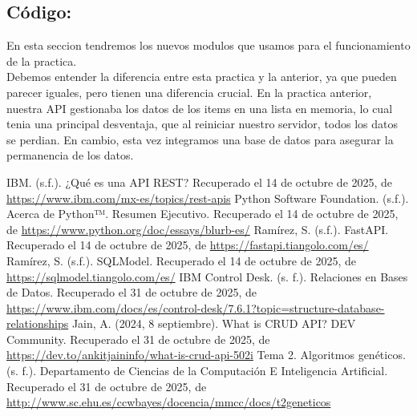 \documentclass[12pt]{article}
\begin{document}
\subsection*{Código:}
En esta seccion tendremos los nuevos modulos que usamos para el funcionamiento de la practica.\\

Debemos entender la diferencia entre esta practica y la anterior, ya que pueden parecer iguales, pero tienen una diferencia crucial. 
En la practica anterior, nuestra API gestionaba los datos de los items en una lista en memoria, lo cual tenia una principal desventaja,
que al reiniciar nuestro servidor, todos los datos se perdian. 
En cambio, esta vez integramos una base de datos para asegurar la permanencia de los datos.



\newpage %

\begin{thebibliography}{99}

     IBM. (s.f.). ¿Qué es una API REST? Recuperado el 14 de octubre de 2025, de \url{https://www.ibm.com/mx-es/topics/rest-apis}
     Python Software Foundation. (s.f.). Acerca de Python™. Resumen Ejecutivo. Recuperado el 14 de octubre de 2025, de \url{https://www.python.org/doc/essays/blurb-es/}
     Ramírez, S. (s.f.). FastAPI. Recuperado el 14 de octubre de 2025, de \url{https://fastapi.tiangolo.com/es/}
     Ramírez, S. (s.f.). SQLModel. Recuperado el 14 de octubre de 2025, de \url{https://sqlmodel.tiangolo.com/es/}
     IBM Control Desk. (s. f.). Relaciones en Bases de Datos. Recuperado el 31 de octubre de 2025, de \url{ https://www.ibm.com/docs/es/control-desk/7.6.1?topic=structure-database-relationships}
     Jain, A. (2024, 8 septiembre). What is CRUD API? DEV Community. Recuperado el 31 de octubre de 2025, de \url{https://dev.to/ankitjaininfo/what-is-crud-api-502i}
     Tema 2. Algoritmos genéticos. (s. f.). Departamento de Ciencias de la Computación E Inteligencia Artificial. Recuperado el 31 de octubre de 2025, de \url{http://www.sc.ehu.es/ccwbayes/docencia/mmcc/docs/t2geneticos}

\end{thebibliography}
\end{document}
